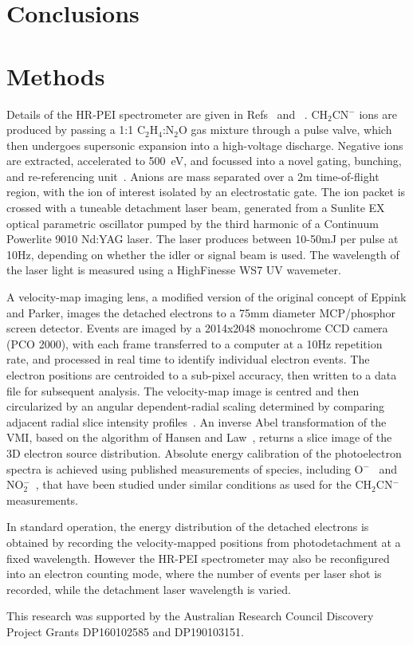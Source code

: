 \documentclass[journal=jpcafh,manuscript=article,layout=onecolumn, 12pt]{achemso}
\newcommand{\onlinecite}[1]{\hspace{-1 ex} \nocite{#1}\citenum{#1}}
\begin{document}
 
\section{Conclusions} 

 
\section{Methods}
Details of the HR-PEI spectrometer are given in Refs~\onlinecite{cav07} and~\onlinecite{dev17}. CH$_2$CN$^-$ ions are produced by passing a 1:1 C$_2$H$_4$:N$_2$O gas mixture through a pulse valve, which then undergoes supersonic expansion into a high-voltage discharge. Negative ions are extracted, accelerated to 500~eV, and focussed into a novel gating, bunching, and re-referencing unit~\cite{ded01}. Anions are mass separated over a 2m time-of-flight region, with the ion of interest isolated by an electrostatic gate. The ion packet is crossed with a tuneable detachment laser beam, generated from a Sunlite EX optical parametric oscillator pumped by the third harmonic of a Continuum Powerlite 9010 Nd:YAG laser. The laser produces between 10-50mJ per pulse at 10Hz, depending on whether the idler or signal beam is used. The wavelength of the laser light is measured using a HighFinesse WS7 UV wavemeter.

A velocity-map imaging lens, a modified version of the original concept of Eppink and Parker, images the detached electrons to a 75mm diameter MCP/phosphor screen detector. Events are imaged by a 2014x2048 monochrome CCD camera (PCO 2000), with each frame transferred to a computer at a 10Hz repetition rate, and processed in real time to identify individual electron events. The electron positions are centroided to a sub-pixel accuracy, then written to a data file for subsequent analysis. The velocity-map image is centred and then circularized by an angular dependent-radial scaling determined by comparing adjacent radial slice intensity profiles~\cite{gas17}. An inverse Abel transformation of the VMI, based on the algorithm of Hansen and Law~\cite{han85,pya16}, returns a slice image of the 3D electron source distribution. Absolute energy calibration of the photoelectron spectra is achieved using published measurements of species, including O$^-$~\cite{cav07} and NO$_2^-$~\cite{law19}, that have been studied under similar conditions as used for the CH$_2$CN$^-$ measurements.

In standard operation, the energy distribution of the detached electrons is obtained by recording the velocity-mapped positions from photodetachment at a fixed wavelength. However the HR-PEI spectrometer may also be reconfigured into an electron counting mode, where the number of events per laser shot is recorded, while the detachment laser wavelength is varied.








\begin{acknowledgement}
	This research was supported by the Australian Research Council Discovery
	Project Grants DP160102585 and DP190103151.  
\end{acknowledgement}


\end{document}
